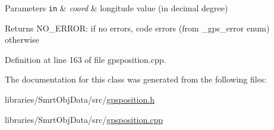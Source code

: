 \begin{DoxyParams}[1]{Parameters}
\mbox{\tt in}  & {\em coord} & longitude value (in decimal degree)\\
\hline
\end{DoxyParams}
\begin{DoxyReturn}{Returns}
N\+O\+\_\+\+E\+R\+R\+O\+R\+: if no errors, code errors (from \+\_\+gps\+\_\+error enum) otherwise 
\end{DoxyReturn}


Definition at line 163 of file gpsposition.\+cpp.



The documentation for this class was generated from the following files\+:\begin{DoxyCompactItemize}
\item 
libraries/\+Smrt\+Obj\+Data/src/\hyperlink{gpsposition_8h}{gpsposition.\+h}\item 
libraries/\+Smrt\+Obj\+Data/src/\hyperlink{gpsposition_8cpp}{gpsposition.\+cpp}\end{DoxyCompactItemize}
